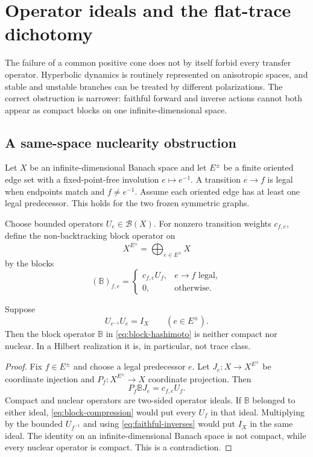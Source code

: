 \section{Operator ideals and the flat-trace dichotomy}
\label{sec:operator}

The failure of a common positive cone does not by itself forbid every transfer
operator.  Hyperbolic dynamics is routinely represented on anisotropic
spaces, and stable and unstable branches can be treated by different
polarizations.  The correct obstruction is narrower: faithful forward and
inverse actions cannot both appear as compact blocks on one
infinite-dimensional space.

\subsection{A same-space nuclearity obstruction}

Let $X$ be an infinite-dimensional Banach space and let $E^\pm$ be a finite
oriented edge set with a fixed-point-free involution $e\mapsto e^{-1}$.  A
transition $e\to f$ is legal when endpoints match and $f\neq e^{-1}$.  Assume
each oriented edge has at least one legal predecessor.  This holds for the
two frozen symmetric graphs.

Choose bounded operators $U_e\in\mathcal B(X)$.  For nonzero transition
weights $c_{f,e}$, define the non-backtracking block operator on
\[
 X^{E^\pm}=\bigoplus_{e\in E^\pm}X
\]
by the blocks
\begin{equation}
 (\mathbb B)_{f,e}=
 \begin{cases}
 c_{f,e}U_f,& e\to f\text{ legal},\\
 0,&\text{otherwise}.
 \end{cases}
 \label{eq:block-hashimoto}
\end{equation}

\begin{theorem}
\label{thm:same-space}
Suppose
\begin{equation}
 U_{e^{-1}}U_e=I_X\qquad(e\in E^\pm).
 \label{eq:faithful-inverses}
\end{equation}
Then the block operator $\mathbb B$ in \eqref{eq:block-hashimoto} is neither
compact nor nuclear.  In a Hilbert realization it is, in particular, not
trace class.
\end{theorem}

\begin{proof}
Fix $f\in E^\pm$ and choose a legal predecessor $e$.  Let
$J_e:X\to X^{E^\pm}$ be coordinate injection and
$P_f:X^{E^\pm}\to X$ coordinate projection.  Then
\begin{equation}
 P_f\mathbb BJ_e=c_{f,e}U_f.
 \label{eq:block-compression}
\end{equation}
Compact and nuclear operators are two-sided operator ideals.  If $\mathbb B$
belonged to either ideal, \eqref{eq:block-compression} would put every $U_f$
in that ideal.  Multiplying by the bounded $U_{f^{-1}}$ and using
\eqref{eq:faithful-inverses} would put $I_X$ in the same ideal.  The identity
on an infinite-dimensional Banach space is not compact, while every nuclear
operator is compact.  This is a contradiction.
\end{proof}

